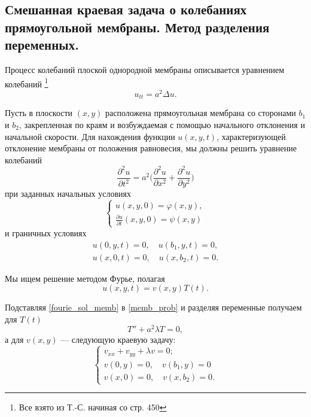 \subsection{Смешанная краевая задача о колебаниях прямоугольной мембраны. Метод разделения переменных.}

Процесс колебаний плоской однородной мембраны описывается уравнением колебаний \footnote{Все взято из Т.-С. начиная со стр. 450}
\begin{equation} \label{memb_prob}
	u_{tt} = a^2 \Delta u.
\end{equation}

Пусть в плоскости $(x, y)$ расположена прямоугольная мембрана со сторонами $b_1$ и $b_2$, закрепленная по краям и возбуждаемая с помощью начального отклонения и начальной скорости. Для нахождения функции $u(x, y, t)$, характеризующей отклонение мембраны от положения равновесия, мы должны решить уравнение колебаний 
\begin{equation}
	\tag{77'}
	\frac{\partial^2 u}{\partial t^2} = a^2 \Bigg(\frac{\partial^2 u}{\partial x^2} + \frac{\partial^2 u}{\partial y^2}\Bigg)
\end{equation}
при заданных начальных условиях 
\begin{equation} \label{init_cond_memb}
	\begin{cases}
		u(x, y, 0) = \varphi(x, y), \\
		\frac{\partial u}{\partial t}(x, y, 0) = \psi(x, y)
	\end{cases}
\end{equation}
и граничных условиях
\begin{align}
	u(0, y, t) = 0, \quad u(b_1, y, t) = 0, \\
	u(x, 0, t) = 0, \quad u(x, b_2, t) = 0. \label{bord_cond_memb}
\end{align}

Мы ищем решение методом Фурье, полагая
\begin{equation} \label{fourie_sol_memb}
	u(x, y, t) = v(x, y) T(t).
\end{equation}

Подставляя \eqref{fourie_sol_memb} в \eqref{memb_prob} и разделяя переменные получаем для $T(t)$
\begin{equation}
	T'' + a^2 \lambda T = 0,
\end{equation}
а для $v(x, y)$ --- следующую краевую задачу:
\begin{equation}
	\begin{cases}
		v_{xx} + v_{yy} + \lambda v = 0; \\
		v(0, y) = 0, \quad v(b_1, y) = 0 \\
		v(x, 0) = 0, \quad v(x, b_2) = 0.
	\end{cases}
\end{equation}

